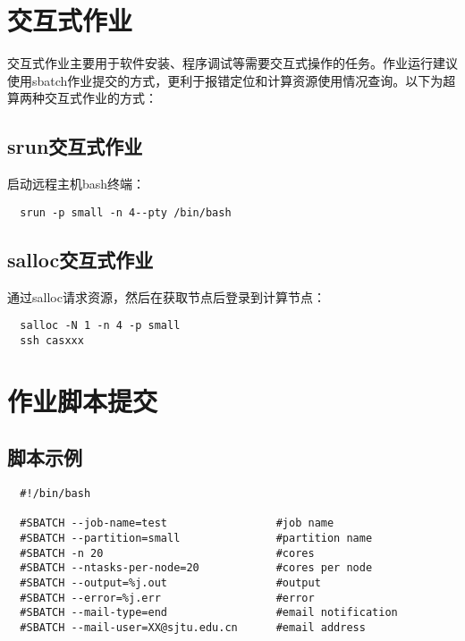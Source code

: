 \documentclass[cn, 12pt, hang, black, chinese]{elegantbook}
\begin{document}
\section{交互式作业}

交互式作业主要用于软件安装、程序调试等需要交互式操作的任务。作业运行建议使用sbatch作业提交的方式，更利于报错定位和计算资源使用情况查询。以下为超算两种交互式作业的方式：

\subsection*{srun交互式作业}
启动远程主机bash终端：
\begin{lstlisting}
  srun -p small -n 4--pty /bin/bash
\end{lstlisting}

\subsection*{salloc交互式作业}
通过salloc请求资源，然后在获取节点后登录到计算节点：
\begin{lstlisting}
  salloc -N 1 -n 4 -p small
  ssh casxxx
\end{lstlisting}

\section{作业脚本提交}

\subsection*{脚本示例}
\begin{lstlisting}
  #!/bin/bash

  #SBATCH --job-name=test                 #job name
  #SBATCH --partition=small               #partition name
  #SBATCH -n 20                           #cores
  #SBATCH --ntasks-per-node=20            #cores per node
  #SBATCH --output=%j.out                 #output
  #SBATCH --error=%j.err                  #error
  #SBATCH --mail-type=end                 #email notification
  #SBATCH --mail-user=XX@sjtu.edu.cn      #email address
\end{lstlisting}
\end{document}
